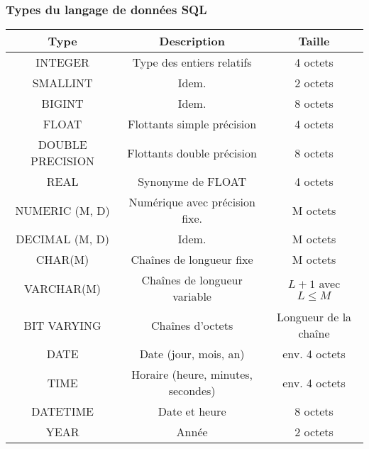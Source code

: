 \begin{frame}[fragile]
\frametitle{Types du langage de données SQL}

\begin{center}
 \begin{tabular}{|c|c|c|}
\hline
Type & Description & Taille \\
\hline
INTEGER & Type des entiers relatifs & 4 octets \\
\hline
SMALLINT & Idem. & 2 octets \\
\hline
BIGINT & Idem. & 8 octets \\
\hline
FLOAT & Flottants simple précision & 4 octets \\
\hline
DOUBLE PRECISION & Flottants double précision & 8 octets \\
\hline
REAL & Synonyme de FLOAT & 4 octets \\
\hline
NUMERIC (M, D) & Numérique avec précision fixe. & M octets \\
\hline
DECIMAL (M, D) & Idem. & M octets \\
\hline
CHAR(M) & Chaînes de longueur fixe & M octets \\
\hline
VARCHAR(M) & Chaînes de longueur variable & $L+1$ avec $L\leq M$ \\
\hline
BIT VARYING & Chaînes d'octets & Longueur de la chaîne \\
\hline
DATE & Date (jour, mois, an) & env. 4 octets \\
\hline
TIME & Horaire (heure, minutes, secondes) & env. 4 octets \\
\hline
DATETIME & Date et heure & 8 octets \\
\hline
YEAR & Année & 2 octets \\
\hline
 \end{tabular}
\end{center}

\end{frame}

